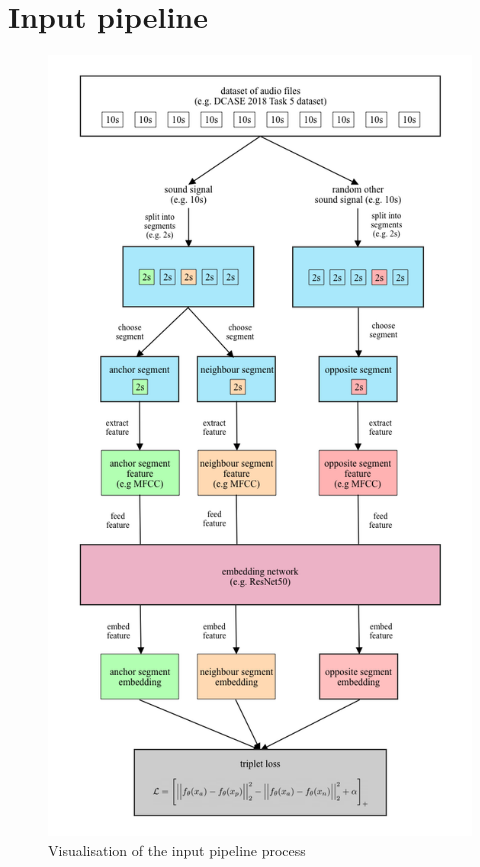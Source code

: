 \section{Input pipeline}
\label{sec:Input-Pipeline}
\begin{figure}[htbp]
	\centering
	\includegraphics[scale=0.4]{img/Input_Pipeline_Visualisation.png}
	\caption{Visualisation of the input pipeline process}
	\label{fig:Input-Pipeline-Visualisation}
\end{figure}
